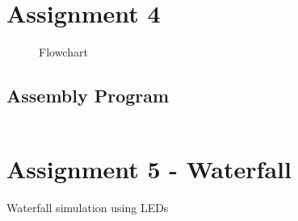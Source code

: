 \documentclass[a4paper, 12pt]{article}
\begin{document}
\section{Assignment 4}



\begin{algorithm}
\begin{algorithmic}
\State{}
\EndProcedure
\caption{}
\label{}
\end{algorithmic}
\end{algorithm}

\begin{figure}[h]

\caption{Flowchart}
\label{}
\end{figure}



\subsection{Assembly Program}
\begin{lstlisting}

\end{lstlisting}
\newpage

\section{Assignment 5 - Waterfall}



\begin{algorithm}
\begin{algorithmic}
 
\Repeat
{}
\EndIf
{}
\EndIf
\Until{$\infty$}
\EndProcedure
\caption{Waterfall simulation using LEDs}
\label{}
\end{algorithmic}
\end{algorithm}
\end{document}

